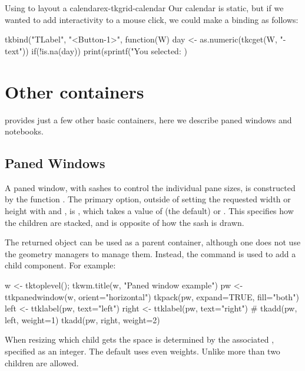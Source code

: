 \begin{example}{Using  to layout a calendar}{ex-tkgrid-calendar}
Our calendar is static, but if we wanted to add interactivity to a
mouse click, we could make a binding as follows:
  
\begin{Schunk}
\begin{Sinput}
 tkbind("TLabel", "<Button-1>", function(W) {
   day <- as.numeric(tkcget(W, "-text"))
   if(!is.na(day))
     print(sprintf("You selected: %
 })
\end{Sinput}
\end{Schunk}


\end{example}

\section{Other containers}
\label{sec:tcltk:other-containers}
\TK\/ provides just a few other basic containers, here we describe paned windows and notebooks.

\subsection{Paned Windows}
\label{sec:tcltk:paned-windows}

A paned window, with sashes to control the individual pane sizes, is constructed by the function
. The primary option, outside of setting
the requested width or height with  and
, is ,
which takes a value of  (the default) or
. This specifies how the children are stacked, and
is opposite of how the sash is drawn.

The returned object can be used as a parent container, although one
does not use the geometry managers to manage them. Instead, the
 command is used to add a child component. For example:
\begin{Schunk}
\begin{Sinput}
 w <- tktoplevel(); tkwm.title(w, "Paned window example")
 pw <- ttkpanedwindow(w, orient="horizontal")
 tkpack(pw, expand=TRUE, fill="both")
 left <- ttklabel(pw, text="left")
 right <- ttklabel(pw, text="right")
 #
 tkadd(pw, left, weight=1)
 tkadd(pw, right, weight=2)
\end{Sinput}
\end{Schunk}
%
When resizing which child gets the space is determined by the
associated , specified as an integer. The default uses
even weights.  Unlike \GTK\/ more than two children are allowed.

